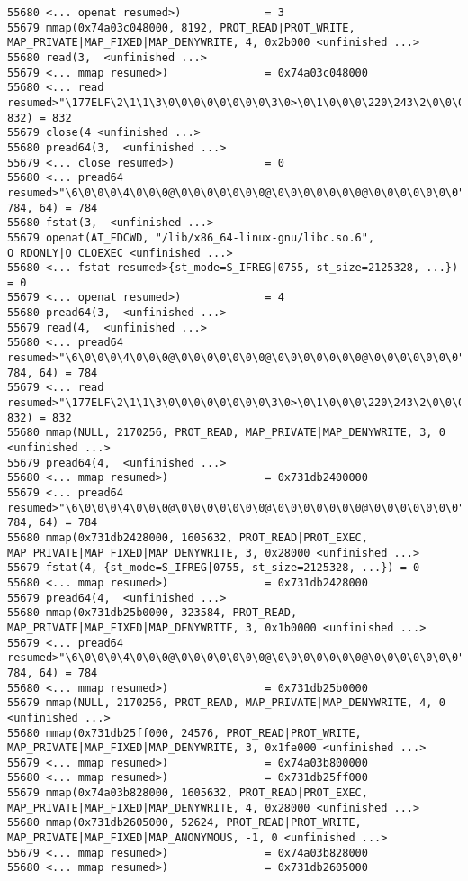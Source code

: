 \begin{verbatim}
55680 <... openat resumed>)             = 3
55679 mmap(0x74a03c048000, 8192, PROT_READ|PROT_WRITE, MAP_PRIVATE|MAP_FIXED|MAP_DENYWRITE, 4, 0x2b000 <unfinished ...>
55680 read(3,  <unfinished ...>
55679 <... mmap resumed>)               = 0x74a03c048000
55680 <... read resumed>"\177ELF\2\1\1\3\0\0\0\0\0\0\0\0\3\0>\0\1\0\0\0\220\243\2\0\0\0\0\0"..., 832) = 832
55679 close(4 <unfinished ...>
55680 pread64(3,  <unfinished ...>
55679 <... close resumed>)              = 0
55680 <... pread64 resumed>"\6\0\0\0\4\0\0\0@\0\0\0\0\0\0\0@\0\0\0\0\0\0\0@\0\0\0\0\0\0\0"..., 784, 64) = 784
55680 fstat(3,  <unfinished ...>
55679 openat(AT_FDCWD, "/lib/x86_64-linux-gnu/libc.so.6", O_RDONLY|O_CLOEXEC <unfinished ...>
55680 <... fstat resumed>{st_mode=S_IFREG|0755, st_size=2125328, ...}) = 0
55679 <... openat resumed>)             = 4
55680 pread64(3,  <unfinished ...>
55679 read(4,  <unfinished ...>
55680 <... pread64 resumed>"\6\0\0\0\4\0\0\0@\0\0\0\0\0\0\0@\0\0\0\0\0\0\0@\0\0\0\0\0\0\0"..., 784, 64) = 784
55679 <... read resumed>"\177ELF\2\1\1\3\0\0\0\0\0\0\0\0\3\0>\0\1\0\0\0\220\243\2\0\0\0\0\0"..., 832) = 832
55680 mmap(NULL, 2170256, PROT_READ, MAP_PRIVATE|MAP_DENYWRITE, 3, 0 <unfinished ...>
55679 pread64(4,  <unfinished ...>
55680 <... mmap resumed>)               = 0x731db2400000
55679 <... pread64 resumed>"\6\0\0\0\4\0\0\0@\0\0\0\0\0\0\0@\0\0\0\0\0\0\0@\0\0\0\0\0\0\0"..., 784, 64) = 784
55680 mmap(0x731db2428000, 1605632, PROT_READ|PROT_EXEC, MAP_PRIVATE|MAP_FIXED|MAP_DENYWRITE, 3, 0x28000 <unfinished ...>
55679 fstat(4, {st_mode=S_IFREG|0755, st_size=2125328, ...}) = 0
55680 <... mmap resumed>)               = 0x731db2428000
55679 pread64(4,  <unfinished ...>
55680 mmap(0x731db25b0000, 323584, PROT_READ, MAP_PRIVATE|MAP_FIXED|MAP_DENYWRITE, 3, 0x1b0000 <unfinished ...>
55679 <... pread64 resumed>"\6\0\0\0\4\0\0\0@\0\0\0\0\0\0\0@\0\0\0\0\0\0\0@\0\0\0\0\0\0\0"..., 784, 64) = 784
55680 <... mmap resumed>)               = 0x731db25b0000
55679 mmap(NULL, 2170256, PROT_READ, MAP_PRIVATE|MAP_DENYWRITE, 4, 0 <unfinished ...>
55680 mmap(0x731db25ff000, 24576, PROT_READ|PROT_WRITE, MAP_PRIVATE|MAP_FIXED|MAP_DENYWRITE, 3, 0x1fe000 <unfinished ...>
55679 <... mmap resumed>)               = 0x74a03b800000
55680 <... mmap resumed>)               = 0x731db25ff000
55679 mmap(0x74a03b828000, 1605632, PROT_READ|PROT_EXEC, MAP_PRIVATE|MAP_FIXED|MAP_DENYWRITE, 4, 0x28000 <unfinished ...>
55680 mmap(0x731db2605000, 52624, PROT_READ|PROT_WRITE, MAP_PRIVATE|MAP_FIXED|MAP_ANONYMOUS, -1, 0 <unfinished ...>
55679 <... mmap resumed>)               = 0x74a03b828000
55680 <... mmap resumed>)               = 0x731db2605000

\end{verbatim}
